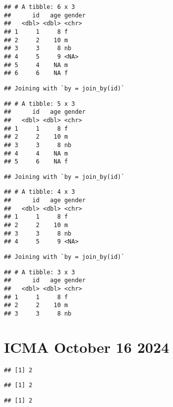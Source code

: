\documentclass[
]{article}
\begin{document}
\begin{verbatim}
## # A tibble: 6 x 3
##      id   age gender
##   <dbl> <dbl> <chr> 
## 1     1     8 f     
## 2     2    10 m     
## 3     3     8 nb    
## 4     5     9 <NA>  
## 5     4    NA m     
## 6     6    NA f
\end{verbatim}

\begin{verbatim}
## Joining with `by = join_by(id)`
\end{verbatim}

\begin{verbatim}
## # A tibble: 5 x 3
##      id   age gender
##   <dbl> <dbl> <chr> 
## 1     1     8 f     
## 2     2    10 m     
## 3     3     8 nb    
## 4     4    NA m     
## 5     6    NA f
\end{verbatim}

\begin{verbatim}
## Joining with `by = join_by(id)`
\end{verbatim}

\begin{verbatim}
## # A tibble: 4 x 3
##      id   age gender
##   <dbl> <dbl> <chr> 
## 1     1     8 f     
## 2     2    10 m     
## 3     3     8 nb    
## 4     5     9 <NA>
\end{verbatim}

\begin{verbatim}
## Joining with `by = join_by(id)`
\end{verbatim}

\begin{verbatim}
## # A tibble: 3 x 3
##      id   age gender
##   <dbl> <dbl> <chr> 
## 1     1     8 f     
## 2     2    10 m     
## 3     3     8 nb
\end{verbatim}

\section{ICMA October 16 2024}\label{icma-october-16-2024}

\begin{verbatim}
## [1] 2
\end{verbatim}

\begin{verbatim}
## [1] 2
\end{verbatim}

\begin{verbatim}
## [1] 2
\end{verbatim}
\end{document}
